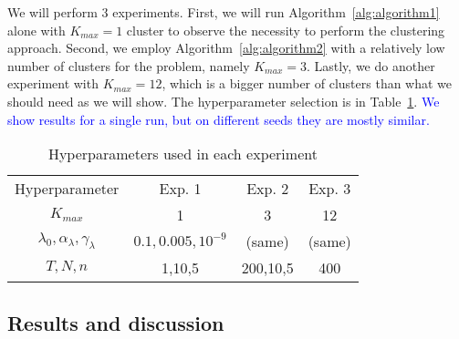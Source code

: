 \documentclass{ecai}
\begin{document}
We will perform 3 experiments. First, we will run Algorithm~\ref{alg:algorithm1} alone with $K_{max}=1$ cluster to observe the necessity to perform the clustering approach. Second, we employ Algorithm~\ref{alg:algorithm2} with a relatively low number of clusters for the problem, namely $K_{max}=3$. Lastly, we do another experiment with $K_{max} = 12$, which is a bigger number of clusters than what we should need as we will show. The hyperparameter selection is in Table~\ref{tab:hyperparameters}. \textcolor{blue}{We show results for a single run, but on different seeds they are mostly similar.}




\begin{table}[h]
    \centering
    \begin{tabular}{c|c|c|c}
    Hyperparameter & Exp. 1 & Exp. 2 & Exp. 3\\
    $K_{max}$ & 1 & 3 &  12 \\
        $\lambda_0,\alpha_\lambda,\gamma_\lambda$ & $0.1,0.005,10^{-9}$ & (same) & (same) \\
        $T,N,n$ & 1,10,5 & 200,10,5 & 400\\
        
    \end{tabular}
    \caption{Hyperparameters used in each experiment}
    \label{tab:hyperparameters}
\end{table}




\subsection{Results and discussion}
\end{document}
